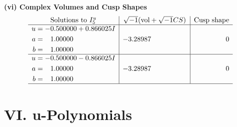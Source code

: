 \documentclass[1p]{elsarticle_modified}
\theoremstyle{definition}
\newcommand{\I}{\sqrt{-1}}
\begin{document}
\newpage\flushleft \textbf{(vi) Complex Volumes and Cusp Shapes}
$$\begin{array}{c|c|c}  
\text{Solutions to }I^u_{5}& \I (\text{vol} + \sqrt{-1}CS) & \text{Cusp shape}\\
 \hline 
\begin{aligned}
u &= -0.500000 + 0.866025 I \\
a &= \phantom{-}1.00000\phantom{ +0.000000I} \\
b &= \phantom{-}1.00000\phantom{ +0.000000I}\end{aligned}
 & -3.28987\phantom{ +0.000000I} & \phantom{-0.000000 } 0 \\ \hline\begin{aligned}
u &= -0.500000 - 0.866025 I \\
a &= \phantom{-}1.00000\phantom{ +0.000000I} \\
b &= \phantom{-}1.00000\phantom{ +0.000000I}\end{aligned}
 & -3.28987\phantom{ +0.000000I} & \phantom{-0.000000 } 0\\
 \hline 
 \end{array}$$\newpage
\newpage\renewcommand{\arraystretch}{1}
\centering \section*{ VI. u-Polynomials}
\end{document}
